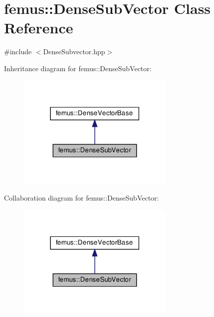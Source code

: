 \hypertarget{classfemus_1_1_dense_sub_vector}{}\section{femus\+:\+:Dense\+Sub\+Vector Class Reference}
\label{classfemus_1_1_dense_sub_vector}


{\ttfamily \#include $<$Dense\+Subvector.\+hpp$>$}



Inheritance diagram for femus\+:\+:Dense\+Sub\+Vector\+:
\nopagebreak
\begin{figure}[H]
\begin{center}
\leavevmode
\includegraphics[width=213pt]{classfemus_1_1_dense_sub_vector__inherit__graph}
\end{center}
\end{figure}


Collaboration diagram for femus\+:\+:Dense\+Sub\+Vector\+:
\nopagebreak
\begin{figure}[H]
\begin{center}
\leavevmode
\includegraphics[width=213pt]{classfemus_1_1_dense_sub_vector__coll__graph}
\end{center}
\end{figure}
